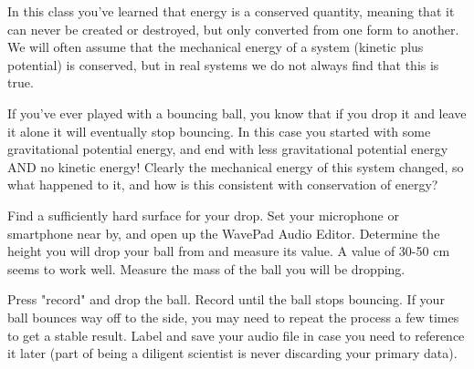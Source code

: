 \renewcommand\thechapter{c1.8a}
\label{lab:ballbounce}

\apparatus
{}


\introduction

In this class you've learned that energy is a conserved quantity, meaning that it can never be created or destroyed, but only converted from one form to another. We will often assume that the mechanical energy of a system (kinetic plus potential) is conserved, but in real systems we do not always find that this is true. 

If you've ever played with a bouncing ball, you know that if you drop it and leave it alone it will eventually stop bouncing.  In this case you started with some gravitational potential energy, and end with less gravitational potential energy AND no kinetic energy! Clearly the mechanical energy of this system changed, so what happened to it, and how is this consistent with conservation of energy?

\observations

Find a sufficiently hard surface for your drop. Set your microphone or smartphone near by, and open up the WavePad Audio Editor. Determine the height you will drop your ball from and measure its value.  A value of 30-50 cm seems to work well. Measure the mass of the ball you will be dropping.

Press "record" and drop the ball. Record until the ball stops bouncing.  If your ball bounces way off to the side, you may need to repeat the process a few times to get a stable result. Label and save your audio file in case you need to reference it later (part of being a diligent scientist is never discarding your primary data).  

